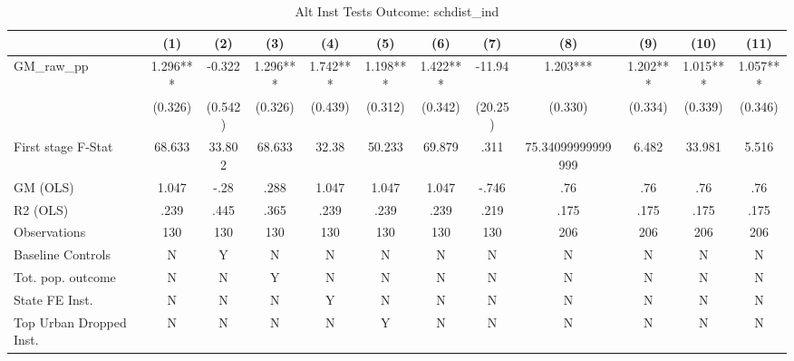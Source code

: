 \begin{table}[htbp]\centering
\def\sym#1{\ifmmode^{#1}\else\(^{#1}\)\fi}
\caption{Alt Inst Tests Outcome: schdist\_ind}
\begin{tabular}{l*{11}{c}}
\toprule
            &\multicolumn{1}{c}{(1)}   &\multicolumn{1}{c}{(2)}   &\multicolumn{1}{c}{(3)}   &\multicolumn{1}{c}{(4)}   &\multicolumn{1}{c}{(5)}   &\multicolumn{1}{c}{(6)}   &\multicolumn{1}{c}{(7)}   &\multicolumn{1}{c}{(8)}   &\multicolumn{1}{c}{(9)}   &\multicolumn{1}{c}{(10)}   &\multicolumn{1}{c}{(11)}   \\
\midrule
GM\_raw\_pp   &    1.296***&   -0.322   &    1.296***&    1.742***&    1.198***&    1.422***&   -11.94   &    1.203***&    1.202***&    1.015***&    1.057***\\
            &  (0.326)   &  (0.542)   &  (0.326)   &  (0.439)   &  (0.312)   &  (0.342)   &  (20.25)   &  (0.330)   &  (0.334)   &  (0.339)   &  (0.346)   \\
\midrule
First stage F-Stat&   68.633   &   33.802   &   68.633   &    32.38   &   50.233   &   69.879   &     .311   &75.34099999999999   &    6.482   &   33.981   &    5.516   \\
GM (OLS)    &    1.047   &     -.28   &     .288   &    1.047   &    1.047   &    1.047   &    -.746   &      .76   &      .76   &      .76   &      .76   \\
R2 (OLS)    &     .239   &     .445   &     .365   &     .239   &     .239   &     .239   &     .219   &     .175   &     .175   &     .175   &     .175   \\
Observations&      130   &      130   &      130   &      130   &      130   &      130   &      130   &      206   &      206   &      206   &      206   \\
Baseline Controls&        N   &        Y   &        N   &        N   &        N   &        N   &        N   &        N   &        N   &        N   &        N   \\
Tot. pop. outcome&        N   &        N   &        Y   &        N   &        N   &        N   &        N   &        N   &        N   &        N   &        N   \\
State FE Inst.&        N   &        N   &        N   &        Y   &        N   &        N   &        N   &        N   &        N   &        N   &        N   \\
Top Urban Dropped Inst.&        N   &        N   &        N   &        N   &        Y   &        N   &        N   &        N   &        N   &        N   &        N   \\

\end{tabular}
\end{table}
